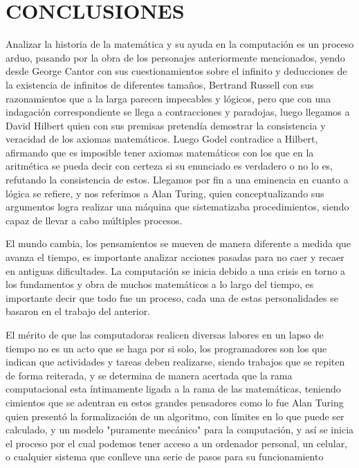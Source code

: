 \documentclass[12pt]{article}
\begin{document}
\section{ CONCLUSIONES}
\large
\vspace{15PT}

Analizar la historia de la matemática y su ayuda en la computación es un proceso arduo, pasando por la obra de los personajes anteriormente mencionados, yendo desde George Cantor con sus cuestionamientos sobre el infinito y deducciones de  la existencia de infinitos de diferentes tamaños, Bertrand Russell con sus razonamientos que a la larga parecen impecables y lógicos, pero que con una indagación correspondiente se llega a contracciones y paradojas, luego llegamos a David Hilbert quien con sus premisas pretendía demostrar la consistencia y veracidad de los axiomas matemáticos. Luego Godel contradice a Hilbert, afirmando que es imposible tener axiomas matemáticos con los que en la aritmética se pueda decir con certeza si su enunciado es verdadero o no lo es, refutando la consistencia de estos. Llegamos por fin a una eminencia en cuanto a lógica se refiere, y nos referimos a Alan Turing, quien conceptualizando sus argumentos logra realizar una máquina que sistematizaba procedimientos, siendo capaz de llevar a cabo múltiples procesos.

\vspace{15PT}
El mundo cambia, los pensamientos se mueven de manera diferente a medida que avanza el tiempo, es importante analizar acciones pasadas para no caer y recaer en antiguas dificultades. La computación se inicia debido a una crisis en torno a los fundamentos y obra de muchos matemáticos a lo largo del tiempo, es importante decir que todo fue un proceso, cada una de estas personalidades se basaron en el trabajo del anterior. 

\vspace{15PT}
El mérito de que las computadoras realicen diversas labores en un lapso de tiempo no es un  acto que se haga por si solo, los programadores son los que indican que actividades y tareas deben realizarse, siendo trabajos que se repiten de forma reiterada, y se determina de manera acertada que la rama computacional esta íntimamente ligada a la rama de las matemáticas, teniendo cimientos que se adentran en estos grandes pensadores como lo fue Alan Turing quien presentó la formalización de un algoritmo, con límites en lo que puede ser calculado, y un modelo "puramente mecánico" para la computación, y así se inicia el proceso por el cual podemos tener acceso a un ordenador personal, un celular, o cualquier sistema que conlleve una serie de pasos para su funcionamiento
\newpage
\end{document}
